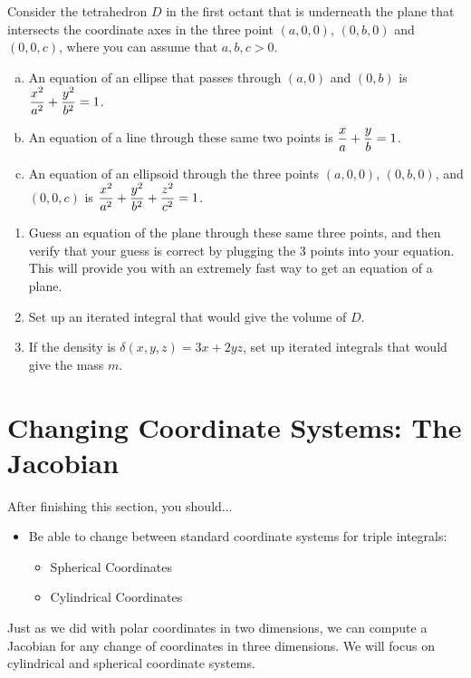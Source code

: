 \begin{problem}
 Consider the tetrahedron $D$ in the first octant that is underneath the plane that intersects the coordinate axes in the three point $(a,0,0)$, $(0,b,0)$ and $(0,0,c)$, where you can assume that $a,b,c>0$.
\begin{enumerate}[a)]
	\item An equation of an ellipse that passes through $(a,0)$ and $(0,b)$ is $\displaystyle\frac{x^2}{a^2}+\frac{y^2}{b^2}=1$.  
	\item An equation of a line through these same two points is $\displaystyle\frac{x}{a}+\frac{y}{b}=1$.  
	\item An equation of an ellipsoid through the three points $(a,0,0)$, $(0,b,0)$, and $(0,0,c)$ is $\displaystyle\frac{x^2}{a^2}+\frac{y^2}{b^2}+\frac{z^2}{c^2}=1$.
\end{enumerate}
\begin{enumerate}
  \item  Guess an equation of the plane through these same three points, and then verify that your guess is correct by plugging the 3 points into your equation. This will provide you with an extremely fast way to get an equation of a plane.
  \item Set up an iterated integral that would give the volume of $D$.
  \item If the density is $\delta(x,y,z) = 3x+2yz$, set up iterated integrals that would give the mass $m$.
\end{enumerate}
\end{problem}

%


\section{Changing Coordinate Systems: The Jacobian}
After finishing this section, you should...
\begin{itemize}
\item Be able to change between standard coordinate systems for triple integrals:
\begin{itemize}
\item Spherical Coordinates
\item Cylindrical Coordinates
\end{itemize}
\end{itemize}

Just as we did with polar coordinates in two dimensions, we can compute a Jacobian for any change of coordinates in three dimensions.  We will focus on cylindrical and spherical coordinate systems. \\


